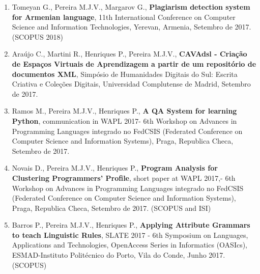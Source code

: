 \documentclass[11pt]{article}
\begin{document}
\begin{enumerate}
\item {Tomeyan G., Pereira M.J.V., Margarov G., {\bf{ Plagiarism detection system for Armenian language}}, 11th International Conference on Computer Science and Information Technologies, Yerevan, Armenia, Setembro de 2017. (SCOPUS 2018)}

\item {Araújo C., Martini R., Henriques P., Pereira M.J.V., {\bf{  CAVAdsl - Criação de Espaços Virtuais de Aprendizagem a partir de um repositório de documentos XML}}, Simpósio de Humanidades Digitais do Sul: Escrita Criativa e Coleções Digitais, Universidad Complutense de Madrid, Setembro de 2017.}

\item {Ramos M., Pereira M.J.V., Henriques P., {\bf{ A QA System for learning Python}}, communication in WAPL 2017- 6th Workshop on Advances in Programming Languages integrado no FedCSIS (Federated Conference on Computer Science and Information Systems), Praga, Republica Checa, Setembro de 2017.}

\item {Novais D., Pereira M.J.V., Henriques P., {\bf{ Program Analysis for Clustering Programmers' Profile}}, short paper at WAPL 2017,- 6th Workshop on Advances in Programming Languages integrado no FedCSIS (Federated Conference on Computer Science and Information Systems), Praga, Republica Checa, Setembro de 2017. (SCOPUS and ISI)}

\item {Barros P., Pereira M.J.V., Henriques P., {\bf{ Applying Attribute Grammars to teach Linguistic Rules}}, SLATE 2017 - 6th Symposium on Languages, Applications and Technologies, OpenAccess Series in Informatics (OASIcs), ESMAD-Instituto Politécnico do Porto, Vila do Conde, Junho 2017. (SCOPUS)}


\end{enumerate}
\end{document}
